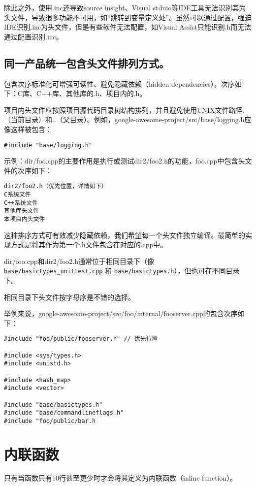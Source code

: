 除此之外，使用.inc还导致source insight、Visual stduio等IDE工具无法识别其为头文件，导致很多功能不可用，如“跳转到变量定义处”。虽然可以通过配置，强迫IDE识别.inc为头文件，但是有些软件无法配置，如Visual Assist只能识别.h而无法通过配置识别.inc。


\subsection{同一产品统一包含头文件排列方式。}
包含次序标准化可增强可读性、避免隐藏依赖（hidden dependencies），次序如下：C库、C++库、其他库的.h、项目内的.h。

项目内头文件应按照项目源代码目录树结构排列，并且避免使用UNIX文件路径.（当前目录）和..（父目录）。例如，google-awesome-project/src/base/logging.h应像这样被包含：
\begin{verbatim}
#include "base/logging.h"
\end{verbatim}

示例：dir/foo.cpp的主要作用是执行或测试dir2/foo2.h的功能，foo.cpp中包含头文件的次序如下：
\begin{verbatim}
dir2/foo2.h（优先位置，详情如下）
C系统文件
C++系统文件
其他库头文件
本项目内头文件
\end{verbatim}

这种排序方式可有效减少隐藏依赖，我们希望每一个头文件独立编译。最简单的实现方式是将其作为第一个.h文件包含在对应的.cpp中。

dir/foo.cpp和dir2/foo2.h通常位于相同目录下（像 \verb|base/basictypes_unittest.cpp| 和 \verb|base/basictypes.h|），但也可在不同目录下。

相同目录下头文件按字母序是不错的选择。

举例来说，google-awesome-project/src/foo/internal/fooserver.cpp的包含次序如下：
\begin{verbatim}
#include "foo/public/fooserver.h" // 优先位置

#include <sys/types.h>
#include <unistd.h>

#include <hash_map>
#include <vector>

#include "base/basictypes.h"
#include "base/commandlineflags.h"
#include "foo/public/bar.h
\end{verbatim}


\section{内联函数}
只有当函数只有10行甚至更少时才会将其定义为内联函数（inline function）。

